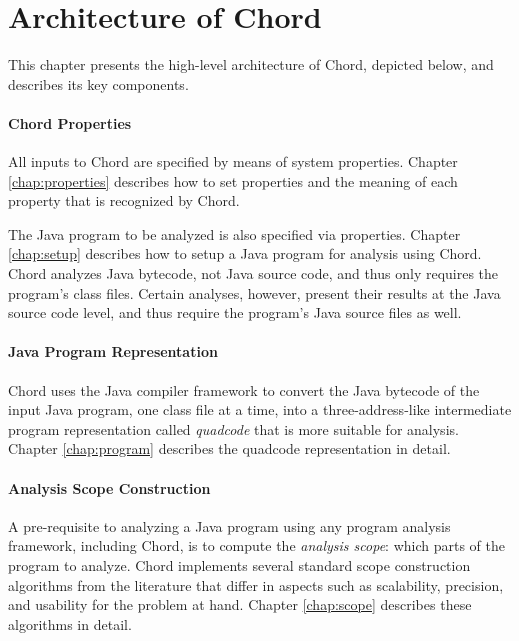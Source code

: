 \chapter{Architecture of Chord}
\label{chap:arch}

This chapter presents the high-level architecture of Chord, depicted below, and describes its key components.

\begin{center}
\end{center}

\subsubsection*{Chord Properties}

All inputs to Chord are specified by means of system properties.  Chapter
\ref{chap:properties} describes how to set properties and the meaning of each
property that is recognized by Chord.

The Java program to be analyzed is also specified via properties.  Chapter
\ref{chap:setup} describes how to setup a Java program for analysis using Chord.
Chord analyzes Java bytecode, not Java source code, and thus only requires the
program's class files.  Certain analyses, however, present their results at the
Java source code level, and thus require the program's Java source files as
well.

\subsubsection*{Java Program Representation}

Chord uses the  Java compiler
framework to convert the Java bytecode of the input Java program, one class file
at a time, into a three-address-like intermediate program representation called
{\it quadcode} that is more suitable for analysis. Chapter
\ref{chap:program} describes the quadcode representation in detail.

\subsubsection*{Analysis Scope Construction}

A pre-requisite to analyzing a Java program using any program analysis
framework, including Chord, is to compute the {\it analysis scope}: which parts
of the program to analyze.  Chord implements several standard scope construction
algorithms from the literature that differ in aspects such as scalability,
precision, and usability for the problem at hand.  Chapter \ref{chap:scope}
describes these algorithms in detail.


